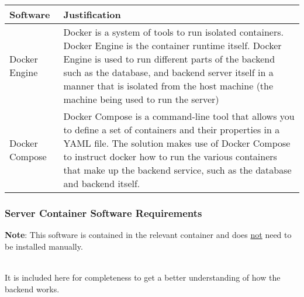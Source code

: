 \documentclass[../../../main.tex]{subfiles}
\begin{document}
\begin{tabular}{ |p{}|p{}| }
    \hline
    \textbf{Software} & \textbf{Justification}                                                                                                                                                                \\
    \hline
    Docker Engine     & Docker is a system of tools to run isolated containers.\newline
    Docker Engine is the container runtime itself.\newline
    Docker Engine is used to run different parts of the backend such as the database, and backend server itself in a manner that is isolated from the host machine (the machine being used to run the server) \\
    \hline
    Docker Compose    & Docker Compose is a command-line tool that allows you to define a set of containers and their properties in a YAML file.\newline
    The solution makes use of Docker Compose to instruct docker how to run the various containers that make up the backend service, such as the database and backend itself.                                  \\
    \hline
\end{tabular}

\pagebreak

\subsubsection{Server Container Software Requirements}

\noindent \textbf{Note}: This software is contained in the relevant container and does \underline{not} need to be installed manually.

\noindent \\ It is included here for completeness to get a better understanding of how the backend works.\\
\end{document}
